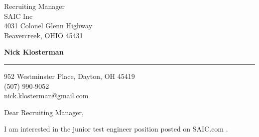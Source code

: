 \documentclass{letter} %
\makeatletter
\newcommand{\contactperson}{Recruiting Manager}
\newcommand{\contactCompany}{SAIC Inc}
\newcommand{\contactStreetAddress}{4031 Colonel Glenn Highway}
\newcommand{\contactCityStateZip}{Beavercreek, OHIO 45431 }
\newcommand{\position}{junior test  engineer }%
\newcommand{\jobpostingsource}{ SAIC.com } %
\newcommand{\personalphonenumber}{(507) 990-9052}
\newcommand{\personalemail}{nick.klosterman@gmail.com}
\makeatother
\begin{document}
\signature{Nick Klosterman}           %
\longindentation=0pt                       %
\let\raggedleft\raggedright                %
 

 
\begin{letter}{\contactperson \\
\contactCompany \\
\contactStreetAddress \\
\contactCityStateZip

}

  \begin{flushright}
 \hfill   \large\bf Nick Klosterman  \\
\end{flushright}
\begin{flushright}
    \medskip\hrule height 1pt
    \hfill 952 Westminster Place, Dayton, OH 45419 \\
    \hfill \personalphonenumber \\
    \hfill \personalemail
  \end{flushright} 
\vfill %

 
\opening{Dear \contactperson,} 

\noindent 
I am interested in the \position position posted on \jobpostingsource. 


\end{letter}
\end{document}
